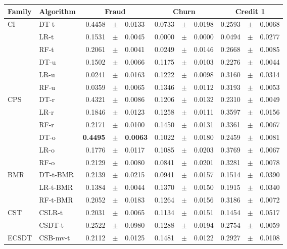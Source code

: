 {\begin{table}[!t]
     \centering
    \footnotesize
    \begin{tabular}{l l r@{\hskip 0in}c@{\hskip 0in}l r@{\hskip 0in}c@{\hskip 0in}l r@{\hskip 
0in}c@{\hskip 0in}l} %
      \hline
    \bf{Family} & \bf{Algorithm} & \multicolumn{3}{c}{\bf{Fraud}} & 
\multicolumn{3}{c}{\bf{Churn}} & \multicolumn{3}{c}{\bf{Credit 1}} \\
      \hline
CI&DT-t & 0.4458 &$\pm$& 0.0133 & 0.0733 &$\pm$& 0.0198 & 0.2593 &$\pm$& 0.0068 \\
&LR-t & 0.1531 &$\pm$& 0.0045 & 0.0000 &$\pm$& 0.0000 & 0.0494 &$\pm$& 0.0277 \\
&RF-t & 0.2061 &$\pm$& 0.0041 & 0.0249 &$\pm$& 0.0146 & 0.2668 &$\pm$& 0.0085 \\
&DT-u & 0.1502 &$\pm$& 0.0066 & 0.1175 &$\pm$& 0.0103 & 0.2276 &$\pm$& 0.0044 \\
&LR-u & 0.0241 &$\pm$& 0.0163 & 0.1222 &$\pm$& 0.0098 & 0.3160 &$\pm$& 0.0314 \\
&RF-u & 0.0359 &$\pm$& 0.0065 & 0.1346 &$\pm$& 0.0112 & 0.3193 &$\pm$& 0.0053 \\
\hline 
CPS&DT-r & 0.4321 &$\pm$& 0.0086 & 0.1206 &$\pm$& 0.0132 & 0.2310 &$\pm$& 0.0049 \\
&LR-r & 0.1846 &$\pm$& 0.0123 & 0.1258 &$\pm$& 0.0111 & 0.3597 &$\pm$& 0.0156 \\
&RF-r & 0.2171 &$\pm$& 0.0100 & 0.1450 &$\pm$& 0.0131 & 0.3361 &$\pm$& 0.0067 \\
&DT-o & \bf{0.4495} &\bf{$\pm$}& \bf{0.0063} & 0.1022 &$\pm$& 0.0180 & 0.2459 &$\pm$& 0.0081 \\
&LR-o & 0.1776 &$\pm$& 0.0117 & 0.1085 &$\pm$& 0.0203 & 0.3769 &$\pm$& 0.0067 \\
&RF-o & 0.2129 &$\pm$& 0.0080 & 0.0841 &$\pm$& 0.0201 & 0.3281 &$\pm$& 0.0078 \\
\hline 
BMR&DT-t-BMR & 0.2139 &$\pm$& 0.0215 & 0.0941 &$\pm$& 0.0157 & 0.1514 &$\pm$& 0.0390 \\
&LR-t-BMR & 0.1384 &$\pm$& 0.0044 & 0.1370 &$\pm$& 0.0150 & 0.1915 &$\pm$& 0.0340 \\
&RF-t-BMR & 0.2052 &$\pm$& 0.0183 & 0.1264 &$\pm$& 0.0156 & 0.3186 &$\pm$& 0.0072\\
\hline 
CST&CSLR-t & 0.2031 &$\pm$& 0.0065 & 0.1134 &$\pm$& 0.0151 & 0.1454 &$\pm$& 0.0517 \\
&CSDT-t & 0.2522 &$\pm$& 0.0980 & 0.1288 &$\pm$& 0.0194 & 0.2754 &$\pm$& 0.0059 \\
\hline 
ECSDT&CSB-mv-t & 0.2112 &$\pm$& 0.0125 & 0.1481 &$\pm$& 0.0122 & 0.2927 &$\pm$& 0.0108 \\

\end{tabular}
\end{table}}
